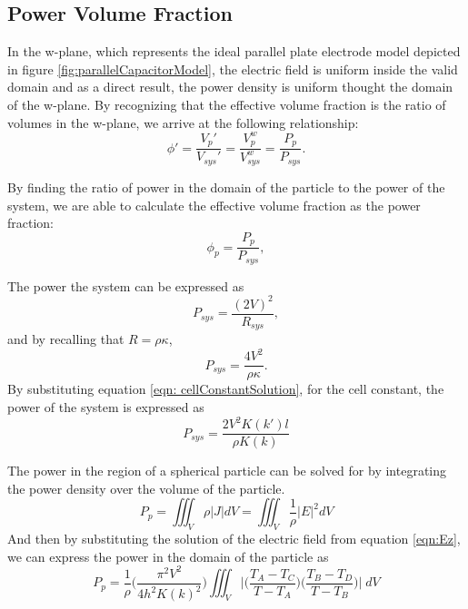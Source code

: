 \subsection*{Power Volume Fraction}
\par In the w-plane, which represents the ideal parallel plate electrode model depicted in figure \ref{fig:parallelCapacitorModel}, the electric field is uniform inside the valid domain and as a direct result, the power density is uniform thought the domain of the w-plane. By recognizing that the effective volume fraction is the ratio of volumes in the w-plane, we arrive at the following relationship:
\begin{equation}
    \phi ' = \frac{V_p'}{V_{sys}'} = \frac{V^w_p}{V^w_{sys}} = \frac{P_p}{P_{sys}}.
    \label{eqn: effectiveVolumeFractions}
\end{equation}

\par By finding the ratio of power in the domain of the particle to the power of the system, we are able to calculate the effective volume fraction as the power fraction:
\begin{equation}
    \phi_p = \frac{P_p}{P_{sys}},
    \label{eqn: powerVolumeFraction_initial}
\end{equation}

\par The power the system can be expressed as
\begin{equation}
    P_{sys} = \frac{(2V)^2}{R_{sys}},
\end{equation}
\noindent and by recalling that $R=\rho\kappa$,
\begin{equation}
    P_{sys} = \frac{4V^2}{\rho\kappa}.
\end{equation}
\noindent By substituting equation \ref{eqn: cellConstantSolution}, for the cell constant, the power of the system is expressed as 
\begin{equation}
    P_{sys} = \frac{2V^2K(k')l}{\rho K(k)}
    \label{eqn: powerSystem}
\end{equation}

\par The power in the region of a spherical particle can be solved for by integrating the power density over the volume of the particle.
\begin{equation}
    P_p = \iiint_V \rho \big| J \big| dV = \iiint_V \frac{1}{\rho} \big| E \big|^2 dV
\end{equation}
\noindent And then by substituting the solution of the electric field from equation \ref{eqn:Ez}, we can express the power in the domain of the particle as
\begin{equation}
    P_p = \frac{1}{\rho}\bigg(\frac{\pi^2 V^2}{4h^2K(k)^2}\bigg)\iiint_V \bigg|\bigg(\frac{T_A-T_C}{T-T_A}\bigg)\bigg(\frac{T_B-T_D}{T-T_B}\bigg)\bigg| \;dV
    \label{eqn: powerParticle}
\end{equation}

